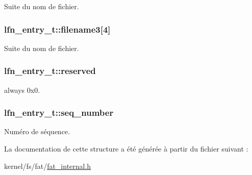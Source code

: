 Suite du nom de fichier. \hypertarget{structlfn__entry__t_aa157718941579c9ef9bb5eba85015ec0}{
\subsubsection[{filename3}]{ lfn\+\_\+entry\+\_\+t\+::filename3\mbox{[}4\mbox{]}}}\label{structlfn__entry__t_aa157718941579c9ef9bb5eba85015ec0}
Suite du nom de fichier. \hypertarget{structlfn__entry__t_a506f9cbd0e4fe209626eedaf48c1f8bf}{
\subsubsection[{reserved}]{ lfn\+\_\+entry\+\_\+t\+::reserved}}\label{structlfn__entry__t_a506f9cbd0e4fe209626eedaf48c1f8bf}
always 0x0. \hypertarget{structlfn__entry__t_a07b88226674917555309538459b194df}{
\subsubsection[{seq\+\_\+number}]{ lfn\+\_\+entry\+\_\+t\+::seq\+\_\+number}}\label{structlfn__entry__t_a07b88226674917555309538459b194df}
Numéro de séquence. 

La documentation de cette structure a été générée à partir du fichier suivant \+:\begin{DoxyCompactItemize}
\item 
kernel/fs/fat/\hyperlink{fat__internal_8h}{fat\+\_\+internal.\+h}\end{DoxyCompactItemize}
